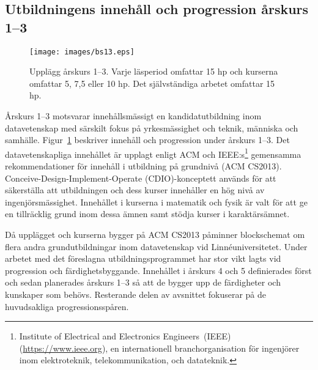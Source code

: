 \subsection{Utbildningens innehåll och progression årskurs 1--3}

\begin{figure}[t]
\centering
\texttt{[image: images/bs13.eps]}
\caption{Upplägg årskurs 1--3. Varje läsperiod omfattar 15 hp och kurserna omfattar 5, 7,5 eller 10 hp. Det självständiga arbetet omfattar 15 hp.\label{fig:bs13}}
\end{figure}

Årskurs 1--3 motsvarar innehållsmässigt en kandidatutbildning inom datavetenskap med särskilt fokus på yrkesmässighet och teknik, människa och samhälle. Figur~\ref{fig:bs13} beskriver innehåll och progression under årskurs 1--3. Det datavetenskapliga innehållet är upplagt enligt ACM och IEEE:s\footnote{Institute of Electrical and Electronics Engineers~(IEEE) (\url{https://www.ieee.org}), en internationell branchorganisation för ingenjörer inom elektroteknik, telekommunikation, och datateknik.} gemensamma rekommendationer för innehåll i utbildning på grundnivå (ACM CS2013). Conceive-Design-Implement-Operate (CDIO)-konceptett används för att säkerställa att utbildningen och dess kurser innehåller en hög nivå av ingenjörsmässighet. Innehållet i kurserna i matematik och fysik är valt för att ge en tillräcklig grund inom dessa ämnen samt stödja kurser i karaktärsämnet.

Då upplägget och kurserna bygger på ACM CS2013 påminner blockschemat om flera andra grundutbildningar inom datavetenskap vid Linnéuniversitetet. Under arbetet med det föreslagna utbildningsprogrammet har stor vikt lagts vid progression och färdighetsbyggande. Innehållet i årskurs 4 och 5 definierades först och sedan planerades årskurs 1–3 så att de bygger upp de färdigheter och kunskaper som behövs. Resterande delen av avsnittet fokuserar på de huvudsakliga progressionsspåren.


